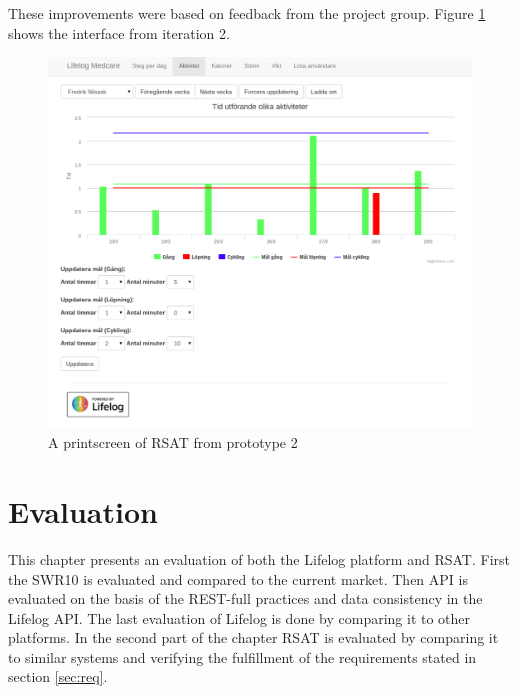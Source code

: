 \documentclass{cslthse-msc}
\begin{document}
These improvements were based on feedback from the project group. Figure \ref{fig:second-screen} shows the interface from iteration 2.





\begin{figure}[!hbt]
\centering
\includegraphics[scale=0.4]{seceenshot-second-version.pdf} 
\caption{A printscreen of RSAT from prototype 2}\label{fig:second-screen}
\end{figure}

\chapter{Evaluation}

 This chapter presents an evaluation of both the Lifelog platform and RSAT. First the SWR10 is evaluated and compared to the current market. Then API is evaluated on the basis of the REST-full practices and data consistency in the Lifelog API. The last evaluation of Lifelog is done by comparing it to other platforms. In the second part of the chapter RSAT is evaluated by comparing it to similar systems and verifying the fulfillment of the requirements stated in section \ref{sec:req}.
\end{document}
